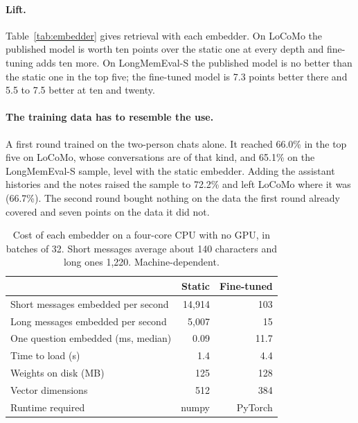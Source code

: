 \documentclass[11pt]{article}
\begin{document}
\paragraph{Lift.} Table~\ref{tab:embedder} gives retrieval with each
embedder. On LoCoMo the published model is worth ten points over the
static one at every depth and fine-tuning adds ten more. On
LongMemEval-S the published model is no better than the static one in
the top five; the fine-tuned model is 7.3 points better there and 5.5
to 7.5 better at ten and twenty.

\paragraph{The training data has to resemble the use.} A first round
trained on the two-person chats alone. It reached 66.0\% in the top
five on LoCoMo, whose conversations are of that kind, and 65.1\% on the
LongMemEval-S sample, level with the static embedder. Adding the
assistant histories and the notes raised the sample to 72.2\% and left
LoCoMo where it was (66.7\%). The second round bought nothing on the
data the first round already covered and seven points on the data it
did not.

\begin{table}[t]
\centering
\small
\begin{tabular}{lrr}
\toprule
 & Static & Fine-tuned \\
\midrule
Short messages embedded per second & 14{,}914 & 103 \\
Long messages embedded per second & 5{,}007 & 15 \\
One question embedded (ms, median) & 0.09 & 11.7 \\
Time to load (s) & 1.4 & 4.4 \\
Weights on disk (MB) & 125 & 128 \\
Vector dimensions & 512 & 384 \\
Runtime required & numpy & PyTorch \\
\bottomrule
\end{tabular}
\caption{Cost of each embedder on a four-core CPU with no GPU, in
batches of 32. Short messages average about 140 characters and long
ones 1{,}220. Machine-dependent.}
\label{tab:embedcost}
\end{table}
\end{document}
